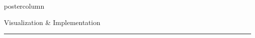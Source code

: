 \documentclass[final,hyperref={pdfpagelabels=false}]{beamer}
\newcommand{\bfBlue}[1]{\textcolor{koaladarkestblue}{\textbf{#1}}}
\begin{document}
\begin{frame}
\begin{columns}
\begin{column}{1\textwidth}
\begin{columns}[T]
\begin{column}{.484\textwidth}
\begin{beamercolorbox}[center,wd=\textwidth]{postercolumn}
\begin{minipage}[T]{.95\textwidth}
\begin{block}{\footnotesize Visualization \& Implementation}
\textcolor{LMUlightgray}{\hrule{}}


%
%
%
%
%
%
%

\end{block}
\end{minipage}
\end{beamercolorbox}
\end{column}
\end{columns}
\end{column}
\end{columns}
\end{frame}
\end{document}
